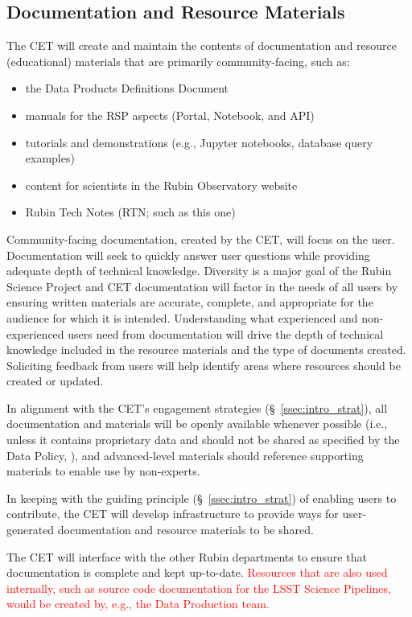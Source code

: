 \documentclass[DM,lsstdraft,toc]{lsstdoc}
\begin{document}
\subsection{Documentation and Resource Materials}\label{ssec:mod_docs}

The CET will create and maintain the contents of documentation and resource (educational) materials that are primarily community-facing, such as:
\begin{itemize}
\item the Data Products Definitions Document 
\item manuals for the RSP aspects (Portal, Notebook, and API)
\item tutorials and demonstrations (e.g., Jupyter notebooks, database query examples)
\item content for scientists in the Rubin Observatory website
\item Rubin Tech Notes (RTN; such as this one)
\end{itemize}

Community-facing documentation, created by the CET, will focus on the user.
Documentation will seek to quickly answer user questions while providing adequate depth of technical knowledge.
Diversity is a major goal of the Rubin Science Project and CET documentation will factor in the needs of all users by ensuring written materials are accurate, complete, and appropriate for the audience for which it is intended.
Understanding what experienced and non-experienced users need from documentation will drive the depth of technical knowledge included in the resource materials and the type of documents created.
Soliciting feedback from users will help identify areas where resources should be created or updated.

In alignment with the CET's engagement strategies (\S~\ref{ssec:intro_strat}), all documentation and materials will be openly available whenever possible (i.e., unless it contains proprietary data and should not be shared as specified by the Data Policy, ), and advanced-level materials should reference supporting materials to enable use by non-experts.

In keeping with the guiding principle (\S~\ref{ssec:intro_strat}) of enabling users to contribute, the CET will develop infrastructure to provide ways for user-generated documentation and resource materials to be shared.

The CET will interface with the other Rubin departments to ensure that documentation is complete and kept up-to-date.
\textcolor{red}{Resources that are also used internally, such as source code documentation for the LSST Science Pipelines, would be created by, e.g., the Data Production team.} 
\end{document}
